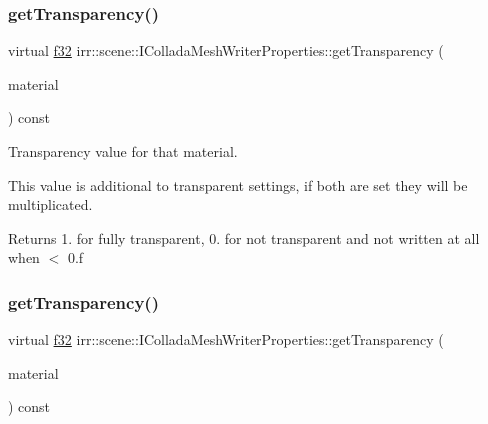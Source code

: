 \subsubsection{\texorpdfstring{get\+Transparency()}{getTransparency()}\hspace{0.1cm}{\footnotesize\ttfamily [1/2]}}
{\footnotesize\ttfamily virtual \hyperlink{namespaceirr_a0277be98d67dc26ff93b1a6a1d086b07}{f32} irr\+::scene\+::\+I\+Collada\+Mesh\+Writer\+Properties\+::get\+Transparency (\begin{DoxyParamCaption}\item[{const \hyperlink{classirr_1_1video_1_1SMaterial}{video\+::\+S\+Material} \&}]{material }\end{DoxyParamCaption}) const\hspace{0.3cm}{\ttfamily [pure virtual]}}



Transparency value for that material. 

This value is additional to transparent settings, if both are set they will be multiplicated. \begin{DoxyReturn}{Returns}
1. for fully transparent, 0. for not transparent and not written at all when $<$ 0.\+f 
\end{DoxyReturn}
\mbox{\label{classirr_1_1scene_1_1IColladaMeshWriterProperties_ac547e1f89f4655751ecd570ad70d010b}} 
\subsubsection{\texorpdfstring{get\+Transparency()}{getTransparency()}\hspace{0.1cm}{\footnotesize\ttfamily [2/2]}}
{\footnotesize\ttfamily virtual \hyperlink{namespaceirr_a0277be98d67dc26ff93b1a6a1d086b07}{f32} irr\+::scene\+::\+I\+Collada\+Mesh\+Writer\+Properties\+::get\+Transparency (\begin{DoxyParamCaption}\item[{const \hyperlink{classirr_1_1video_1_1SMaterial}{video\+::\+S\+Material} \&}]{material }\end{DoxyParamCaption}) const\hspace{0.3cm}{\ttfamily [pure virtual]}}



